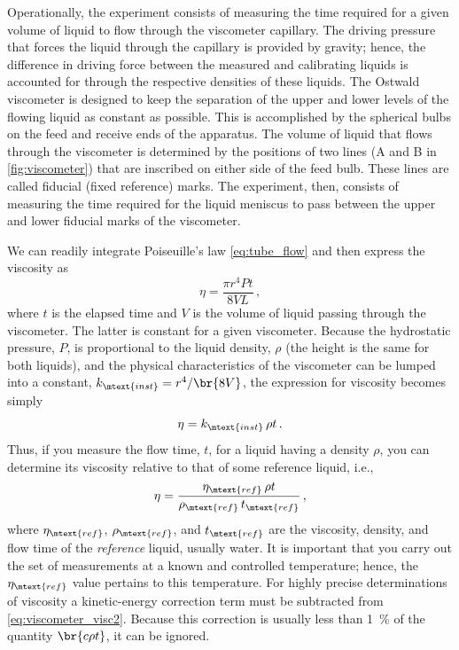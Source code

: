 Operationally, the experiment consists of measuring the time required for a given volume of liquid to flow through the viscometer capillary. 
The driving pressure that forces the liquid through the capillary is provided by gravity; hence, the difference in driving force between the measured and calibrating liquids is accounted for through the respective densities of these liquids. 
The Ostwald viscometer is designed to keep the separation of the upper and lower levels of the flowing liquid as constant as possible. 
This is accomplished by the spherical bulbs on the feed and receive ends of the apparatus. 
The volume of liquid that flows through the viscometer is determined by the positions of two lines (A and B in \cref{fig:viscometer}) that are inscribed on either side of the feed bulb. 
These lines are called fiducial (fixed reference) marks. 
The experiment, then, consists of measuring the time required for the liquid meniscus to pass between the upper and lower fiducial marks of the viscometer.

We can readily integrate Poiseuille's law \cref{eq:tube_flow} and then express the viscosity as
\begin{equation}
	\eta = \frac{\pi r^4 P t}{8 V L} \, ,
	\label{eq:viscometer_visc1}
\end{equation}
where \( t \) is the elapsed time and \( V \) is the volume of liquid passing through the viscometer. 
The latter is constant for a given viscometer. 
Because the hydrostatic pressure, \( P \), is proportional to the liquid density, \( \rho \) (the height is the same for both liquids), and the physical characteristics of the viscometer can be lumped into a constant, \( k_\mtext{inst} = r^4/\br{8 V} \), the expression for viscosity becomes simply
\begin{equation}
	\eta = k_\mtext{inst}\, \rho t \, .
	\label{eq:viscometer_visc2}
\end{equation}
Thus, if you measure the flow time, \( t \), for a liquid having a density \( \rho \), you can determine its viscosity relative to that of some reference liquid, i.e.,
\begin{equation}
	\eta = \frac{\eta_\mtext{ref} \, \rho t}{\rho_\mtext{ref} \, t_\mtext{ref}} \, ,
	\label{eq:ref_viscosity}
\end{equation}
where \( \eta_\mtext{ref} \), \( \rho_\mtext{ref} \), and \( t_\mtext{ref} \) are the viscosity, density, and flow time of the \emph{reference} liquid, usually water. 
It is important that you carry out the set of measurements at a known and controlled temperature; hence, the \( \eta_\mtext{ref} \) value pertains to this temperature. 
For highly precise determinations of viscosity a kinetic-energy correction term must be subtracted from \cref{eq:viscometer_visc2}. 
Because this correction is usually less than \qty{1}{\percent} of the quantity \( \br{c \rho t} \), it can be ignored.

